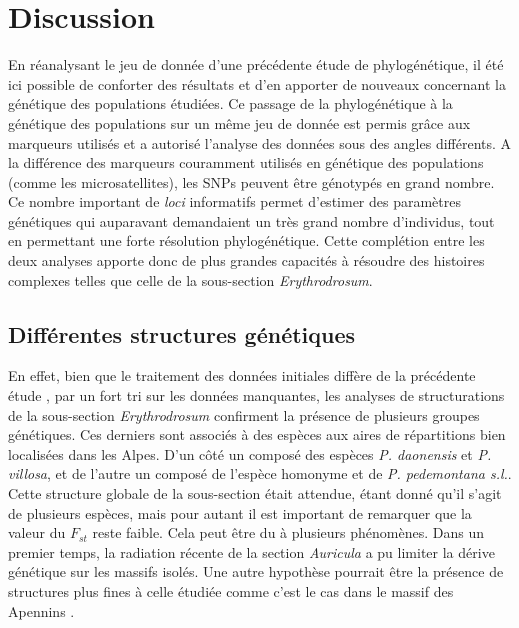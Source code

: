 \section{Discussion}

En réanalysant le jeu de donnée d'une précédente étude de phylogénétique, il été ici possible de conforter des résultats et d'en apporter de nouveaux concernant la génétique des populations étudiées. Ce passage de la phylogénétique à la génétique des populations sur un même jeu de donnée est permis grâce aux marqueurs utilisés et a autorisé l'analyse des données sous des angles différents. A la différence des marqueurs couramment utilisés en génétique des populations (comme les microsatellites), les SNPs peuvent être génotypés en grand nombre. Ce nombre important de \textit{loci} informatifs permet d'estimer des paramètres génétiques qui auparavant demandaient un très grand nombre d'individus, tout en permettant une forte résolution phylogénétique. Cette complétion entre les deux analyses apporte donc de plus grandes capacités à résoudre des histoires complexes telles que celle de la sous-section \textit{Erythrodrosum}.

\subsection{Différentes structures génétiques}

En effet, bien que le traitement des données initiales diffère de la précédente étude \citep{Boucher2016a}, par un fort tri sur les données manquantes, les analyses de structurations de la sous-section \textit{Erythrodrosum} confirment la présence de plusieurs groupes génétiques. Ces derniers sont associés à des espèces aux aires de répartitions bien localisées dans les Alpes. D'un côté un  composé des espèces \textit{P. daonensis} et \textit{P. villosa}, et de l'autre un  composé de l'espèce homonyme et de \textit{P. pedemontana s.l.}. Cette structure globale de la sous-section était attendue, étant donné qu'il s'agit de plusieurs espèces, mais pour autant il est important de remarquer que la valeur du $F_{st}$ reste faible. Cela peut être du à plusieurs phénomènes. Dans un premier temps, la radiation récente de la section \textit{Auricula} \citep{Boucher2016} a pu limiter la dérive génétique sur les massifs isolés. Une autre hypothèse pourrait être la présence de structures plus fines à celle étudiée comme c'est le cas dans le massif des Apennins \citep{Crema2009}.

